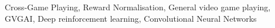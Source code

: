 Cross-Game Playing, Reward Normalisation, General video game playing, GVGAI, Deep reinforcement learning, Convolutional Neural Networks
